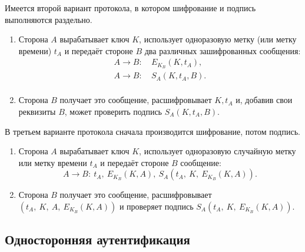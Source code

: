 Имеется второй вариант протокола, в котором шифрование и подпись выполняются раздельно.
\begin{enumerate}
    \item Сторона $A$ вырабатывает ключ $K$, использует одноразовую метку (или метку времени) $t_{A}$ и передаёт стороне $B$ два различных зашифрованных сообщения:
            \[ \begin{array}{ll}
                A \rightarrow B: & ~ E_{K_B}(K, t_A), \\
                A \rightarrow B: & ~ S_A(K, t_A, B). \\
            \end{array} \]
    \item Сторона $B$ получает это сообщение, расшифровывает $K, t_A$ и, добавив свои реквизиты $B$, может проверить подпись $S_A(K, t_A, B)$.
\end{enumerate}

В третьем варианте протокола сначала производится шифрование, потом подпись.
\begin{enumerate}
    \item Сторона $A$ вырабатывает ключ $K$, использует одноразовую случайную метку или метку времени $t_A$ и передаёт стороне $B$ сообщение:
        \[ A \rightarrow B: ~ t_A, ~ E_{K_B}(K, A), ~ S_A(t_A, ~ K, ~ E_{K_B}(K, A)). \]
    \item Сторона $B$ получает это сообщение, расшифровывает $\left( t_A, ~ K, ~ A, ~ E_{K_B}(K, A) \right)$ и проверяет подпись $S_A(t_A, ~ K, ~ E_{K_B}(K, A))$.
\end{enumerate}




\subsection{Односторонняя аутентификация}













